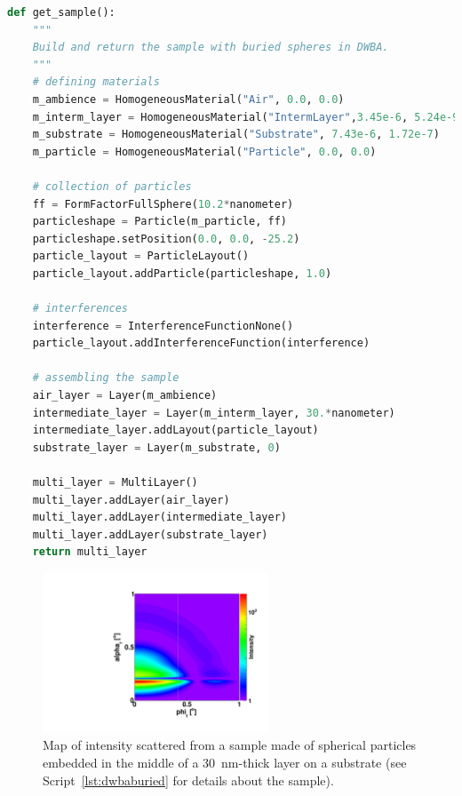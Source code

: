 \begin{lstlisting}[language=python, style=eclipseboxed,numbers=none,nolol,caption={\Code{Python} script to generate a sample where spherical particles are embedded in the middle of a layer on a substrate.},label={lst:dwbaburied}]
def get_sample():
    """
    Build and return the sample with buried spheres in DWBA.
    """
    # defining materials
    m_ambience = HomogeneousMaterial("Air", 0.0, 0.0)
    m_interm_layer = HomogeneousMaterial("IntermLayer",3.45e-6, 5.24e-9)
    m_substrate = HomogeneousMaterial("Substrate", 7.43e-6, 1.72e-7)
    m_particle = HomogeneousMaterial("Particle", 0.0, 0.0)

    # collection of particles
    ff = FormFactorFullSphere(10.2*nanometer)
    particleshape = Particle(m_particle, ff)
    particleshape.setPosition(0.0, 0.0, -25.2)
    particle_layout = ParticleLayout()
    particle_layout.addParticle(particleshape, 1.0)

    # interferences
    interference = InterferenceFunctionNone()
    particle_layout.addInterferenceFunction(interference)

    # assembling the sample
    air_layer = Layer(m_ambience)
    intermediate_layer = Layer(m_interm_layer, 30.*nanometer)
    intermediate_layer.addLayout(particle_layout)
    substrate_layer = Layer(m_substrate, 0)

    multi_layer = MultiLayer()
    multi_layer.addLayer(air_layer)
    multi_layer.addLayer(intermediate_layer)
    multi_layer.addLayer(substrate_layer)
    return multi_layer
\end{lstlisting}


\begin{figure}[tb]
\centering
\includegraphics[angle=-90,width=0.6\textwidth]{fig/gisasmap/figIntBuriedPart.pdf}
\caption{Map of intensity scattered from a sample made of spherical particles embedded in the middle of a 30~nm-thick layer on a substrate (see Script~\ref{lst:dwbaburied} for details about the sample).}
\label{fig:dwbaburied}
\end{figure}

